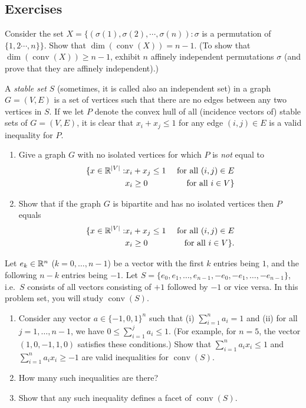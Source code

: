 \documentclass[12pt]{article}
\newcommand{\conv}{\operatorname{conv}}
\begin{document}
\begin{enumerate}
\end{enumerate}     

\subsection*{Exercises}
\begin{exercises}
\item Consider the set $X=\{(\sigma(1), \sigma(2), \cdots, \sigma(n)):
  \sigma$ is a permutation of $\{1,2\cdots,n\}\}$. Show that
  $\dim(\conv(X))=n-1$. (To show that $\dim(\conv(X))\geq n-1$, exhibit
  $n$ affinely independent permutations $\sigma$ (and prove that they
  are affinely independent).)

\item
A {\it stable set} $S$ (sometimes, it is called also an independent
set) in a graph $G=(V,E)$ is a set of vertices such that there are no
edges between any two vertices in $S$. If we let $P$ denote the convex
hull of all (incidence vectors of) stable sets of $G=(V,E)$, it is clear
that $x_i + x_j \leq 1$ for any edge $(i,j)\in E$ is a valid
inequality for $P$. 

\begin{enumerate}
\item
Give a graph $G$ with no isolated vertices for which $P$ is {\it not} equal to 
\begin{eqnarray*} 
\{x\in {\mathbb R}^{|V|}: &  x_i + x_j \leq 1 & \mbox{ for all } (i,j)\in E \\
 &  x_i \geq 0 & \mbox{ for all } i \in V\} 
\end{eqnarray*}

\item
Show that if the graph $G$ is bipartite and has no isolated vertices then $P$ equals
\begin{eqnarray*} 
\{x\in {\mathbb R}^{|V|}: &  x_i + x_j \leq 1 & \mbox{ for all } (i,j)\in E \\
 &  x_i \geq 0 & \mbox{ for all } i \in V\}. 
\end{eqnarray*}
\end{enumerate}

\item
Let $e_k\in {\mathbb R}^n$ ($k=0,\ldots,n-1$) be a vector with the first $k$
entries being $1$, and the following $n-k$ entries being  $-1$. Let
$S=\{e_0, e_1, \ldots, e_{n-1}, -e_0, -e_1,\ldots, -e_{n-1}\}$, i.e.\
$S$ consists of all vectors consisting of $+1$ followed by $-1$ or
vice versa. In this problem set, you will study $\conv(S)$. 
\begin{enumerate}
\item
Consider any vector $a\in\{-1,0,1\}^n$ such that (i) $\sum_{i=1}^n
a_i=1$ and (ii) for all $j=1,\ldots,n-1$, we have $0\leq \sum_{i=1}^j
a_i\leq 1$. (For example, for $n=5$, the vector $(1,0,-1,1,0)$
satisfies these conditions.)
Show that $\sum_{i=1}^n a_ix_i\leq 1$ and $\sum_{i=1}^n
a_ix_i\geq -1$ are valid inequalities for $\conv(S)$.
\item
How many such inequalities are there?
\item
Show that any such inequality defines a facet of $\conv(S)$. 


\end{enumerate}
\end{exercises}
\end{document}
